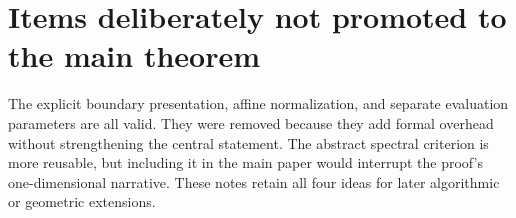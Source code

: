 \documentclass[11pt]{article}
\theoremstyle{definition}
\begin{document}
\section{Items deliberately not promoted to the main theorem}

The explicit boundary presentation, affine normalization, and separate
evaluation parameters are all valid.  They were removed because they add
formal overhead without strengthening the central statement.  The abstract
spectral criterion is more reusable, but including it in the main paper
would interrupt the proof's one-dimensional narrative.  These notes retain
all four ideas for later algorithmic or geometric extensions.
\end{document}
